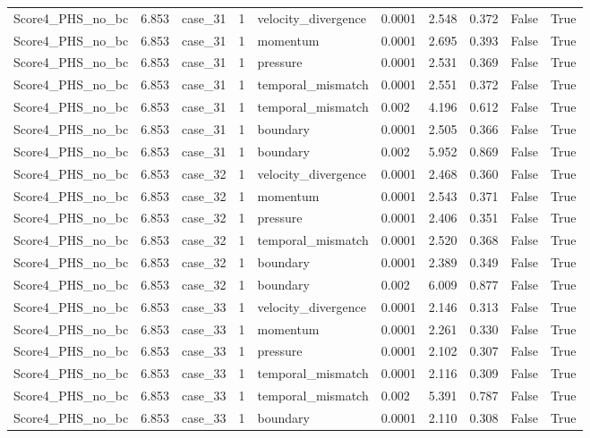 \begin{longtable}{llllllllll}
Score4\_PHS\_no\_bc & 6.853 & case\_31 & 1 & velocity\_divergence & 0.0001 & 2.548 & 0.372 & False & True \\
Score4\_PHS\_no\_bc & 6.853 & case\_31 & 1 & momentum & 0.0001 & 2.695 & 0.393 & False & True \\
Score4\_PHS\_no\_bc & 6.853 & case\_31 & 1 & pressure & 0.0001 & 2.531 & 0.369 & False & True \\
Score4\_PHS\_no\_bc & 6.853 & case\_31 & 1 & temporal\_mismatch & 0.0001 & 2.551 & 0.372 & False & True \\
Score4\_PHS\_no\_bc & 6.853 & case\_31 & 1 & temporal\_mismatch & 0.002 & 4.196 & 0.612 & False & True \\
Score4\_PHS\_no\_bc & 6.853 & case\_31 & 1 & boundary & 0.0001 & 2.505 & 0.366 & False & True \\
Score4\_PHS\_no\_bc & 6.853 & case\_31 & 1 & boundary & 0.002 & 5.952 & 0.869 & False & True \\
Score4\_PHS\_no\_bc & 6.853 & case\_32 & 1 & velocity\_divergence & 0.0001 & 2.468 & 0.360 & False & True \\
Score4\_PHS\_no\_bc & 6.853 & case\_32 & 1 & momentum & 0.0001 & 2.543 & 0.371 & False & True \\
Score4\_PHS\_no\_bc & 6.853 & case\_32 & 1 & pressure & 0.0001 & 2.406 & 0.351 & False & True \\
Score4\_PHS\_no\_bc & 6.853 & case\_32 & 1 & temporal\_mismatch & 0.0001 & 2.520 & 0.368 & False & True \\
Score4\_PHS\_no\_bc & 6.853 & case\_32 & 1 & boundary & 0.0001 & 2.389 & 0.349 & False & True \\
Score4\_PHS\_no\_bc & 6.853 & case\_32 & 1 & boundary & 0.002 & 6.009 & 0.877 & False & True \\
Score4\_PHS\_no\_bc & 6.853 & case\_33 & 1 & velocity\_divergence & 0.0001 & 2.146 & 0.313 & False & True \\
Score4\_PHS\_no\_bc & 6.853 & case\_33 & 1 & momentum & 0.0001 & 2.261 & 0.330 & False & True \\
Score4\_PHS\_no\_bc & 6.853 & case\_33 & 1 & pressure & 0.0001 & 2.102 & 0.307 & False & True \\
Score4\_PHS\_no\_bc & 6.853 & case\_33 & 1 & temporal\_mismatch & 0.0001 & 2.116 & 0.309 & False & True \\
Score4\_PHS\_no\_bc & 6.853 & case\_33 & 1 & temporal\_mismatch & 0.002 & 5.391 & 0.787 & False & True \\
Score4\_PHS\_no\_bc & 6.853 & case\_33 & 1 & boundary & 0.0001 & 2.110 & 0.308 & False & True \\

\end{longtable}
